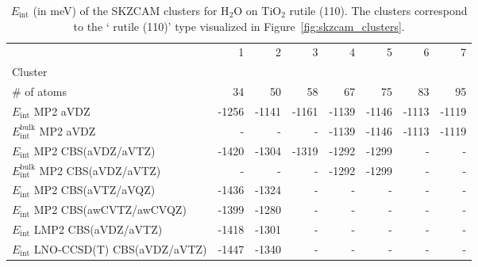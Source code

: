 \begin{table}
\caption{\label{tab:system_eint_r-tio2_h2o}$E_\textrm{int}$ (in meV) of the SKZCAM clusters for H$_2$O on TiO$_2$ rutile (110). The clusters correspond to the ` rutile (110)' type visualized in Figure~\ref{fig:skzcam_clusters}.}
\begin{adjustbox}{center,max width=1.4\textwidth}
\begin{tabular}{lrrrrrrr}
\toprule
 & 1 & 2 & 3 & 4 & 5 & 6 & 7 \\ 
Cluster &  &  &  &  &  &  &  \\
\midrule
\# of atoms & 34 & 50 & 58 & 67 & 75 & 83 & 95 \\
$E_\textrm{int}$ MP2 aVDZ & -1256 & -1141 & -1161 & -1139 & -1146 & -1113 & -1119 \\
$E_\textrm{int}^\textrm{bulk}$ MP2 aVDZ & - & - & - & -1139 & -1146 & -1113 & -1119 \\
$E_\textrm{int}$ MP2 CBS(aVDZ/aVTZ) & -1420 & -1304 & -1319 & -1292 & -1299 & - & - \\
$E_\textrm{int}^\textrm{bulk}$ MP2 CBS(aVDZ/aVTZ) & - & - & - & -1292 & -1299 & - & - \\
$E_\textrm{int}$ MP2 CBS(aVTZ/aVQZ) & -1436 & -1324 & - & - & - & - & - \\
$E_\textrm{int}$ MP2 CBS(awCVTZ/awCVQZ) & -1399 & -1280 & - & - & - & - & - \\
$E_\textrm{int}$ LMP2 CBS(aVDZ/aVTZ) & -1418 & -1301 & - & - & - & - & - \\
$E_\textrm{int}$ LNO-CCSD(T) CBS(aVDZ/aVTZ) & -1447 & -1340 & - & - & - & - & - \\
\bottomrule
\end{tabular}
\end{adjustbox}
\end{table}

